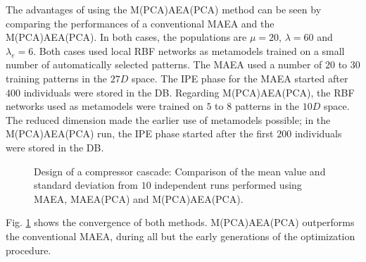 The advantages of using the M(PCA)AEA(PCA) method can be seen by comparing the performances of a conventional MAEA and the M(PCA)AEA(PCA). In both cases, the populations are $\mu\!=\!20$, $\lambda\!=\!60$ and $\lambda_e\!=\!6$. Both cases used local RBF networks as metamodels trained on a small number of automatically selected patterns. The MAEA used a number of  $20$ to $30$ training patterns in the $27D$ space. The IPE phase for the MAEA started after $400$ individuals were stored in the DB. Regarding M(PCA)AEA(PCA), the RBF networks used as metamodels were trained on $5$ to $8$ patterns in the  $10D$ space. The reduced dimension made the earlier use of metamodels possible; in the M(PCA)AEA(PCA) run, the IPE phase started after the first $200$ individuals were stored in the DB. 


\begin{figure}[h!]
\begin{minipage}[b]{1\linewidth}
 \centering
\end{minipage}
\caption{Design of a compressor cascade:  Comparison of the mean value and standard deviation from  $10$ independent runs performed using MAEA, MAEA(PCA) and M(PCA)AEA(PCA).} 
\label{PCADrelaRes}
\end{figure}

Fig. \ref{PCADrelaRes} shows the convergence of both methods. M(PCA)AEA(PCA) outperforms the conventional MAEA, during all but the early generations of the optimization procedure. 

